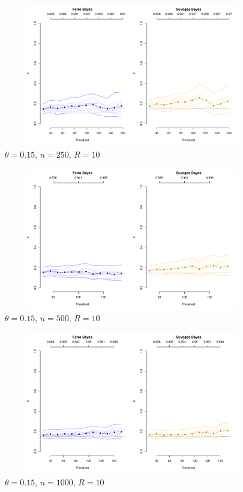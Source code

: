 \documentclass[12pt]{article}
\begin{document}
\newpage

\begin{figure}
\begin{center}
\includegraphics[width=5.5in, height=2.45in]{../extremal_comparison/figs/sim_frechet_hier_15_250_10.pdf}
\caption{$\theta=0.15$, $n=250$, $R=10$}
\end{center}
\end{figure}

\begin{figure}
\begin{center}
\includegraphics[width=5.5in, height=2.45in]{../extremal_comparison/figs/sim_frechet_hier_15_500_10.pdf}
\caption{$\theta=0.15$, $n=500$, $R=10$}
\end{center}
\end{figure}

\begin{figure}
\begin{center}
\includegraphics[width=5.5in, height=2.45in]{../extremal_comparison/figs/sim_frechet_hier_15_1000_10.pdf}
\caption{$\theta=0.15$, $n=1000$, $R=10$}
\end{center}
\end{figure}
\end{document}
